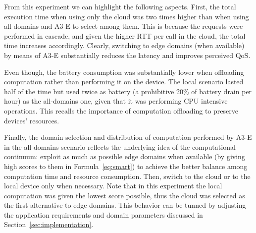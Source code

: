 From this experiment we can highlight the following aspects. First, the total execution time when using only the cloud was two times higher than when using all domains and A3-E to select among them. This is because the requests were performed in cascade, and given the higher RTT per call in the cloud, the total time increases accordingly. Clearly, switching to edge domains (when available) by means of A3-E substantially reduces the latency and improves perceived QoS.

Even though, the battery consumption was substantially lower when offloading computation rather than performing it on the device. The local scenario lasted half of the time but used twice as battery (a prohibitive 20\% of battery drain per hour) as the all-domains one, given that it was performing CPU intensive operations. This recalls the importance of computation offloading to preserve devices' resources.

Finally, the domain selection and distribution of computation performed by A3-E in the all domains scenario reflects the underlying idea of the computational continuum: exploit as much as possible edge domains when available (by giving high scores to them in Formula~\ref{eq:smart}) to achieve the better balance among computation time and resource consumption. Then, switch to the cloud or to the local device only when necessary. Note that in this experiment the local computation was given the lowest score possible, thus the cloud was selected as the first alternative to edge domains. This behavior can be tunned by adjusting the application requirements and domain parameters discussed in Section~\ref{sec:implementation}.




